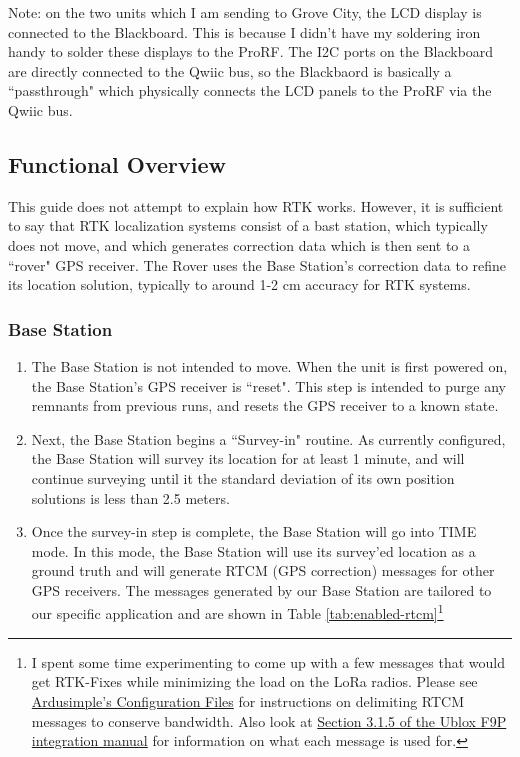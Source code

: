 \documentclass{article}%
\begin{document}
\begin{myquote}
	Note: on the two units which I am sending to Grove City, the LCD display is connected to the Blackboard.  This is because I didn't have my soldering iron handy to solder these displays to the ProRF.  The I2C ports on the Blackboard are directly connected to the Qwiic bus, so the Blackbaord is basically a ``passthrough" which physically connects the LCD panels to the ProRF via the Qwiic bus.
\end{myquote}

\subsection{Functional Overview}
This guide does not attempt to explain how RTK works.  However, it is sufficient to say that RTK localization systems consist of a bast station, which typically does not move, and which generates correction data which is then sent to a ``rover" GPS receiver. 
The Rover uses the Base Station's correction data to refine its location solution, typically to around 1-2 cm accuracy for RTK systems.
\subsubsection{Base Station}
\begin{enumerate}
	\item The Base Station is not intended to move.  When the unit is first powered on, the Base Station's GPS receiver is ``reset".  This step is intended to purge any remnants from previous runs, and resets the GPS receiver to a known state.

	\item Next, the Base Station begins a ``Survey-in" routine.  As currently configured, the Base Station will survey its location for at least 1 minute, and will continue surveying until it the standard deviation of its own position solutions is less than 2.5 meters.
	\item Once the survey-in step is complete, the Base Station will go into TIME mode.  In this mode, the Base Station will use its survey'ed location as a ground truth and will generate RTCM (GPS correction) messages for other GPS receivers.  The messages generated by our Base Station are tailored to our specific application and are shown in Table \ref{tab:enabled-rtcm}\footnote{I spent some time experimenting to come up with a few messages that would get RTK-Fixes while minimizing the load on the LoRa radios.  Please see \href{https://www.ardusimple.com/configuration-files/}{Ardusimple's Configuration Files} for instructions on delimiting RTCM messages to conserve bandwidth.  Also look at \href{https://www.u-blox.com/sites/default/files/ZED-F9P_IntegrationManual_\%28UBX-18010802\%29.pdf}{Section 3.1.5 of the Ublox F9P integration manual} for information on what each message is used for.}
\end{enumerate}
\end{document}
